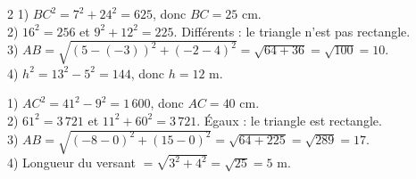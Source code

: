 \begin{multicols}{2}
1) $BC^{2}=7^{2}+24^{2}=625$, donc $BC=25$ cm.\\
2) $16^{2}=256$ et $9^{2}+12^{2}=225$. Différents : le triangle n'est pas rectangle.\\
3) $AB=\sqrt{(5-(-3))^{2}+(-2-4)^{2}}=\sqrt{64+36}=\sqrt{100}=10$.\\
4) $h^{2}=13^{2}-5^{2}=144$, donc $h=12$ m.

1) $AC^{2}=41^{2}-9^{2}=1\,600$, donc $AC=40$ cm.\\
2) $61^{2}=3\,721$ et $11^{2}+60^{2}=3\,721$. Égaux : le triangle est rectangle.\\
3) $AB=\sqrt{(-8-0)^{2}+(15-0)^{2}}=\sqrt{64+225}=\sqrt{289}=17$.\\
4) Longueur du versant $=\sqrt{3^{2}+4^{2}}=\sqrt{25}=5$ m.

\end{multicols}
\exercicesBanner
